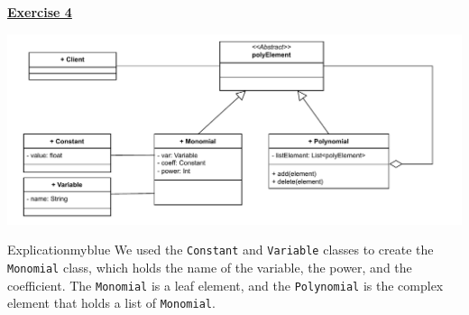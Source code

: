 \newpage
\begin{center}
    \Huge{\textbf{\underline{Exercise 4}}}
\end{center}

\vspace{0.45cm}

\begin{center}
    \includegraphics[height=0.22\textheight]{Exercices/EX4/ex4.drawio.pdf}
\end{center}

\vspace{0.25cm}

\begin{prettyBox}{Explication}{myblue}
We used the \texttt{Constant} and \texttt{Variable} classes to create the 
\texttt{Monomial} class, which holds the name of the variable, the power, and the coefficient. 
The \texttt{Monomial} is a leaf element, and the \texttt{Polynomial} is the complex element 
that holds a list of \texttt{Monomial}.
\end{prettyBox}

